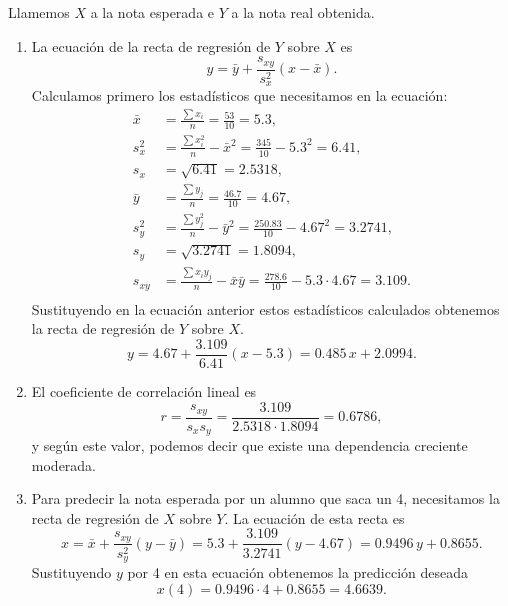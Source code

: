 {Llamemos $X$ a la nota esperada e $Y$ a la nota real obtenida.
\begin{enumerate}
\item La ecuación de la recta de regresión de $Y$ sobre $X$ es
\[
y=\bar y+\frac{s_{xy}}{s_{x}^2}(x-\bar x).
\]
Calculamos primero los estadísticos que necesitamos en la ecuación:
\begin{align*}
\bar x &= \frac{\sum x_{i}}{n}=\frac{53}{10}=5.3,  \\
s_{x}^2 &= \frac{\sum x_{i}^2}{n}-\bar x^2 = \frac{345}{10}-5.3^2=6.41,  \\
s_{x} &=\sqrt{6.41}=2.5318,\\
\bar y &= \frac{\sum y_{j}}{n}=\frac{46.7}{10}=4.67,  \\
s_{y}^2 &= \frac{\sum y_{j}^2}{n}-\bar y^2 =
\frac{250.83}{10}-4.67^2=3.2741,  \\
s_{y}&=\sqrt{3.2741}=1.8094,\\
s_{xy} &= \frac{\sum x_{i}y_{j}}{n}-\bar x\bar y = \frac{278.6}{10}-5.3\cdot 4.67 =3.109.  \\
\end{align*}
Sustituyendo en la ecuación anterior estos estadísticos calculados obtenemos la recta de regresión de $Y$ sobre $X$.
\[
y=4.67+\frac{3.109}{6.41}(x-5.3)=0.485\,x+2.0994.
\]

\item El coeficiente de correlación lineal es
\[
r=\frac{s_{xy}}{s_{x}s_{y}}=\frac{3.109}{2.5318\cdot 1.8094}=0.6786,
\]
y según este valor, podemos decir que existe una dependencia creciente moderada.

\item Para predecir la nota esperada por un alumno que saca un 4, necesitamos la recta de regresión de $X$ sobre $Y$. La ecuación de esta
recta es
\[
x=\bar x+\frac{s_{xy}}{s_{y}^2}(y-\bar y)= 5.3+\frac{3.109}{3.2741}(y-4.67)=0.9496\,y+0.8655.
\]
Sustituyendo $y$ por 4 en esta ecuación obtenemos la predicción deseada
\[
x(4)=0.9496\cdot 4+0.8655=4.6639.
\]
\end{enumerate}
}


